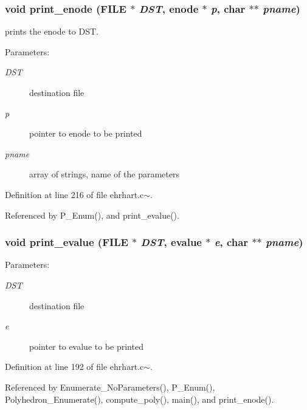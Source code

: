 \subsubsection{\setlength{\rightskip}{0pt plus 5cm}void print\_\-enode (FILE $\ast$ {\em DST}, enode $\ast$ {\em p}, char $\ast$$\ast$ {\em pname})}\label{ehrhart_8c~_a11}


prints the enode to DST.

\begin{Desc}
\item[Parameters: ]\par
\begin{description}
\item[{\em 
DST}]destination file  \item[{\em 
p}]pointer to enode to be printed  \item[{\em 
pname}]array of strings, name of the parameters \end{description}
\end{Desc}


Definition at line 216 of file ehrhart.c$\sim$.

Referenced by P\_\-Enum(), and print\_\-evalue().

\subsubsection{\setlength{\rightskip}{0pt plus 5cm}void print\_\-evalue (FILE $\ast$ {\em DST}, evalue $\ast$ {\em e}, char $\ast$$\ast$ {\em pname})}\label{ehrhart_8c~_a10}


\begin{Desc}
\item[Parameters: ]\par
\begin{description}
\item[{\em 
DST}]destination file \item[{\em 
e}]pointer to evalue to be printed \end{description}
\end{Desc}


Definition at line 192 of file ehrhart.c$\sim$.

Referenced by Enumerate\_\-No\-Parameters(), P\_\-Enum(), Polyhedron\_\-Enumerate(), compute\_\-poly(), main(), and print\_\-enode().

